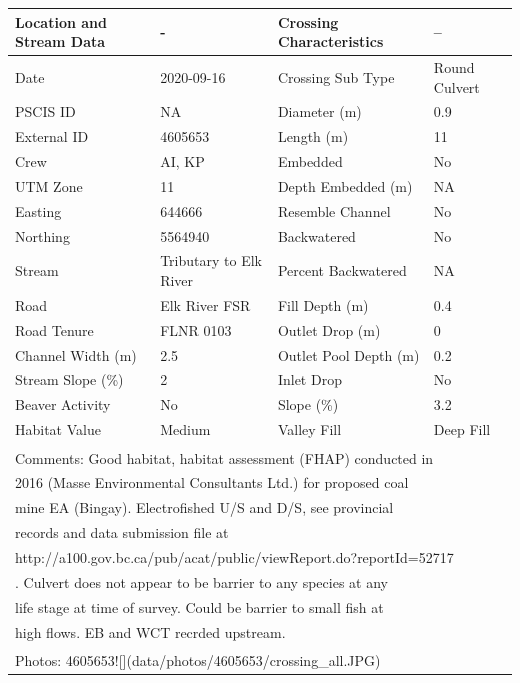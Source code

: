 \documentclass[
]{book}
\begin{document}
\begin{tabular}{llll}
\toprule
Location and Stream Data & - & Crossing Characteristics & --\\
\midrule
Date & 2020-09-16 & Crossing Sub Type & Round Culvert\\
PSCIS ID & NA & Diameter (m) & 0.9\\
External ID & 4605653 & Length (m) & 11\\
Crew & AI, KP & Embedded & No\\
UTM Zone & 11 & Depth Embedded (m) & NA\\
\addlinespace
Easting & 644666 & Resemble Channel & No\\
Northing & 5564940 & Backwatered & No\\
Stream & Tributary to Elk River & Percent Backwatered & NA\\
Road & Elk River FSR & Fill Depth (m) & 0.4\\
Road Tenure & FLNR 0103 & Outlet Drop (m) & 0\\
\addlinespace
Channel Width (m) & 2.5 & Outlet Pool Depth (m) & 0.2\\
Stream Slope (\%) & 2 & Inlet Drop & No\\
Beaver Activity & No & Slope (\%) & 3.2\\
Habitat Value & Medium & Valley Fill & Deep Fill\\
\bottomrule
\multicolumn{4}{l}{\textsuperscript{} Comments: Good habitat, habitat assessment (FHAP) conducted in}\\
\multicolumn{4}{l}{2016 (Masse Environmental Consultants Ltd.) for proposed coal}\\
\multicolumn{4}{l}{mine EA (Bingay). Electrofished U/S and D/S, see provincial}\\
\multicolumn{4}{l}{records and data submission file at}\\
\multicolumn{4}{l}{http://a100.gov.bc.ca/pub/acat/public/viewReport.do?reportId=52717}\\
\multicolumn{4}{l}{. Culvert does not appear to be barrier to any species at any}\\
\multicolumn{4}{l}{life stage at time of survey.  Could be barrier to small fish at}\\
\multicolumn{4}{l}{high flows. EB and WCT recrded upstream.}\\
\multicolumn{4}{l}{\textsuperscript{} Photos: 4605653![](data/photos/4605653/crossing\_all.JPG)}\\
\end{tabular}
\end{document}
